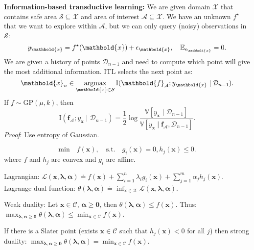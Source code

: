 \documentclass[9pt]{extarticle}
\newenvironment{topic}[1]
{\textbf{\sffamily \colorbox{black}{\rlap{\textbf{\textcolor{white}{#1}}}\hspace{\linewidth}\hspace{-2\fboxsep}}}}
{}
\newenvironment{subtopic}[1]
{\textbf{\sffamily #1:}}
{}
\renewcommand{\vec}[1]{\ensuremath{\mathbold{#1}}}
\renewcommand{\Var}{\mathbb{V}}
\begin{document}
\begin{multicols*}{3}
\begin{topic}{Uncertainty quantification}
        \begin{subtopic}{Information-based transductive learning}
            We are given domain $\mathcal{X}$ that contains safe area $\mathcal{S} \subseteq \mathcal{X}$ and
            area of interest $\mathcal{A} \subseteq \mathcal{X}$. We have an unknown $f^\star$ that we want to
            explore within $\mathcal{A}$, but we can only query (noisy) observations in $\mathcal{S}$: \[
                y_{\vec{x}} = f^\star(\vec{x}) + \epsilon_{\vec{x}}, \quad \E_{\epsilon_{\vec{x}}} = 0.
            \]
            We are given a history of points $\mathcal{D}_{n-1}$ and need to compute which point will give the
            most additional information. ITL selects the next point as: \[
                \vec{x}_n \in \argmax_{\vec{x} \in \mathcal{S}} \mathrm{I}(\vec{f}_{\mathcal{A}}; y_{\vec{x}} \mid \mathcal{D}_{n-1}).
            \]
            If $f \sim \mathrm{GP}(\mu, k)$, then \[
                \mathrm{I}(\vec{f}_{\mathcal{A}}; y_{\vec{x}} \mid \mathcal{D}_{n-1}) = \frac{1}{2} \log \frac{\Var[y_{\vec{x}} \mid \mathcal{D}_{n-1}]}{\Var[y_{\vec{x}} \mid \vec{f}_{\mathcal{A}}, \mathcal{D}_{n-1}]}.
            \]
            \textit{Proof}: Use entropy of Gaussian.

        \end{subtopic}

    \end{topic}

    \begin{topic}{Convex optimization and SVMs}
        \[
            \text{min} \quad f(\vec{x}), \quad \text{s.t.} \quad g_i(\vec{x}) = 0, h_j(\vec{x}) \leq 0.
        \]
        where $f$ and $h_j$ are convex and $g_i$ are affine.

        Lagrangian: $\mathcal{L}(\vec{x}, \vec{\lambda}, \vec{\alpha}) \doteq f(\vec{x}) + \sum_{i=1}^{n}
            \lambda_i g_i(\vec{x}) + \sum_{j=1}^{m} \alpha_j h_j(\vec{x})$. Lagrange dual function:
        $\theta(\vec{\lambda}, \vec{\alpha}) \doteq \inf_{\vec{x} \in \mathcal{X}} \mathcal{L}(\vec{x},
            \vec{\lambda}, \vec{\alpha})$.

        Weak duality: Let $\vec{x} \in \mathcal{C}$, $\vec{\alpha} \geq \vec{0}$, then
        $\theta(\vec{\lambda}, \vec{\alpha}) \leq f(\vec{x})$. Thus: $\max_{\vec{\lambda}, \vec{\alpha}
                \geq \vec{0}} \theta(\vec{\lambda}, \vec{\alpha}) \leq \min_{\vec{x} \in \mathcal{C}} f(\vec{x})$.

        If there is a Slater point (exists $\vec{x} \in \mathcal{C}$ such that $h_j(\vec{x}) < 0$ for all
        $j$) then strong duality: $\max_{\vec{\lambda}, \vec{\alpha} \geq \vec{0}} \theta(\vec{\lambda},
            \vec{\alpha}) = \min_{\vec{x} \in \mathcal{C}} f(\vec{x})$.


\end{topic}
\end{multicols*}
\end{document}
